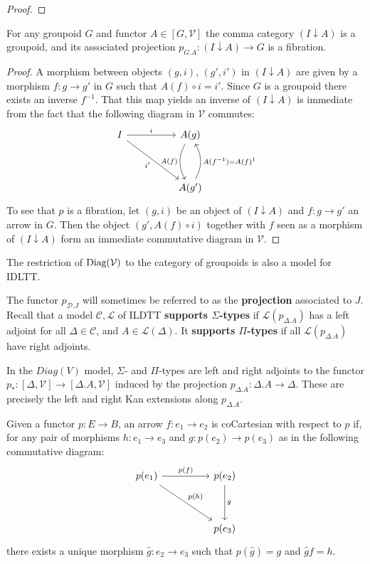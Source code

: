 \begin{thm}
\begin{proof}
\end{proof}
\begin{lem}
For any groupoid $G$ and functor $A \in [G, \mathcal{V}]$ the comma category $(I \downarrow A)$ is a groupoid, and its associated projection $p_{G.A} : (I \downarrow A) \to G$ is a fibration.
\begin{proof}
A morphism between objects $(g, i)$, $(g', i')$ in $(I \downarrow A)$ are given by a morphism $f : g \to g'$ in $G$ such that $A(f) \circ i = i'$. Since $G$ is a groupoid there exists an inverse $f^{-1}$. That this map yields an inverse of $(I \downarrow A)$ is immediate from the fact that the following diagram in $\mathcal{V}$ commutes:
\[
\ti
I \ar[rd,"i'",swap] \ar[r, "i"] & A(g) \ar[d, "A(f)", bend right,swap] \\
& A(g') \ar[u, "A(f^{-1}) = A(f)^{1}", bend right,swap]
\kz
\]
To see that $p$ is a fibration, let $(g, i)$ be an object of $(I \downarrow A)$ and $f : g \to g'$ an arrow in $G$. Then the object $(g', A(f)\circ i)$ together with $f$ seen as a morphism of $(I \downarrow A)$ form an immediate commutative diagram in $\mathcal{V}$.
\end{proof}
\end{lem}
\begin{cor}
The restriction of $\operatorname{\text{Diag}}(\mathcal{V})$ to the category of groupoids is also a model for IDLTT.
\end{cor}

\end{thm}
The functor $p_{\mathcal{D}.J}$ will sometimes be referred to as the \textbf{projection} associated to $J$.
Recall that a model $\mathcal{C}, \mathcal{L}$ of ILDTT \textbf{supports $\Sigma$-types} if $\mathcal{L}(p_{\Delta.A})$ has a left adjoint for all $\Delta \in \mathcal{C}$, and $A \in \mathcal{L}(\Delta)$. It \textbf{supports $\Pi$-types} if all $\mathcal{L}(p_{\Delta.A})$ have right adjoints.
\begin{rem}
In the $Diag(V)$ model, $\Sigma$- and $\Pi$-types are left and right adjoints to the functor $p_* : [\Delta, \mathcal{V}] \to [\Delta.A, \mathcal{V}]$ induced by the projection $p_{\Delta.A} : \Delta.A \to \Delta$. These are precisely the left and right Kan extensions along $p_{\Delta.A}$.
\end{rem}
\begin{defn}
Given a functor $p : E \to B$, an arrow $f : e_1 \to e_2$ is coCartesian with respect to $p$ if, for any pair of morphisms $h : e_1 \to e_3$ and $g : p(e_2) \to p(e_3)$ as in the following commutative diagram:
\[
\ti
p(e_1) \ar[r, "p(f)"] \ar[rd, "p(h)"] & p(e_2) \ar[d, "g"] \\
& p(e_3)
\kz
\]
there exists a unique morphism $\hat g : e_2 \to e_3$ such that $p(\hat g) = g$ and $\hat g f = h$.
\end{defn}
